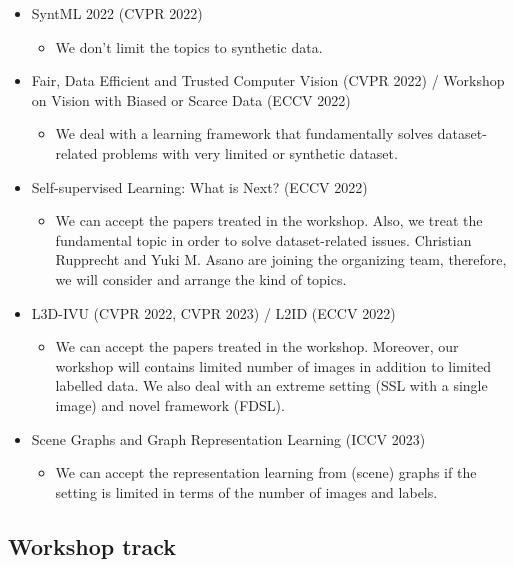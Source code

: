 \documentclass{article}
\newcommand{\cYoshi}[1]{{\color{cyan}{#1}}} %
\begin{document}
\cYoshi{This section is still TBD. Yoshi will update very soon!}

\begin{itemize}
    \item SyntML 2022 (CVPR 2022)
    \begin{itemize}
    \item We don't limit the topics to synthetic data.
    \end{itemize}
    \item Fair, Data Efficient and Trusted Computer Vision (CVPR 2022) / Workshop on Vision with Biased or Scarce Data (ECCV 2022)
    \begin{itemize}
    \item We deal with a learning framework that fundamentally solves dataset-related problems with very limited or synthetic dataset.
    \end{itemize}
    \item Self-supervised Learning: What is Next? (ECCV 2022)
    \begin{itemize}
    \item We can accept the papers treated in the workshop. Also, we treat the fundamental topic in order to solve dataset-related issues. Christian Rupprecht and Yuki M. Asano are joining the organizing team, therefore, we will consider and arrange the kind of topics.
    \end{itemize}
    \item L3D-IVU (CVPR 2022, CVPR 2023) / L2ID (ECCV 2022)
    \begin{itemize}
    \item We can accept the papers treated in the workshop. Moreover, our workshop will contains limited number of images in addition to limited labelled data. We also deal with an extreme setting (SSL with a single image) and novel framework (FDSL).
    \end{itemize}

    \item Scene Graphs and Graph Representation Learning (ICCV 2023)
    \begin{itemize}
    \item We can accept the representation learning from (scene) graphs if the setting is limited in terms of the number of images and labels.
    \end{itemize}
\end{itemize}

\subsection{Workshop track}
\end{document}
